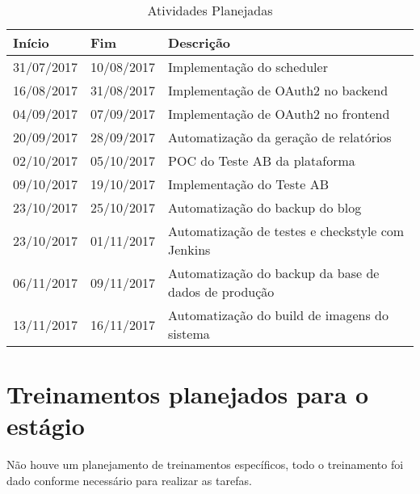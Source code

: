 \begin{table}[H]
\begin{center}
\caption[Atividades Planejadas]
{Atividades Planejadas}\label{tab:tabPlan}

\begin{tabular}{llp{7cm}} \hline

\hline
\textbf{Início}    & \textbf{Fim} &  \textbf{Descrição}                             \\
\hline
31/07/2017        & 10/08/2017      & Implementação do \gls{scheduler}\\
16/08/2017        & 31/08/2017      & Implementação de \gls{OAuth2} no \gls{backend}\\
04/09/2017        & 07/09/2017      & Implementação de \gls{OAuth2} no \gls{frontend}\\
20/09/2017        & 28/09/2017      & Automatização da geração de relatórios\\
02/10/2017        & 05/10/2017      & \gls{POC} do \gls{Teste AB} da plataforma\\
09/10/2017        & 19/10/2017      & Implementação do \gls{Teste AB}\\
23/10/2017        & 25/10/2017      & Automatização do \gls{backup} do blog\\
23/10/2017        & 01/11/2017      & Automatização de testes e \gls{checkstyle} com \gls{Jenkins}\\
06/11/2017        & 09/11/2017      & Automatização do \gls{backup} da base de dados de produção\\
13/11/2017        & 16/11/2017      & Automatização do build de imagens do sistema\\
\hline

\hline
\end{tabular}
\end{center}
\end{table}

\section{Treinamentos planejados para o estágio}

Não houve um planejamento de treinamentos específicos, todo o treinamento foi dado conforme necessário para realizar as tarefas.\\

